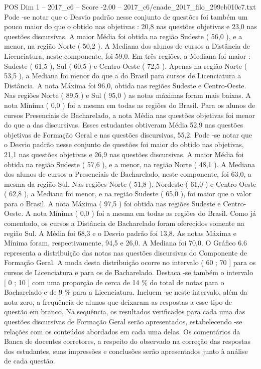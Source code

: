 \begin{textsample}{POS Dim 1 – 2017\_c6 – Score -2.00 – 2017\_c6/enade\_2017\_filo\_299cb010c7.txt}
Pode -se notar que o Desvio padrão nesse conjunto de questões foi também um pouco maior do que o obtido nas objetivas : 20,8 nas questões objetivas e 23,0 nas questões discursivas.
A maior Média foi obtida na região Sudeste ( 56,0 ), e a menor, na região Norte ( 50,2 ).
A Mediana dos alunos de cursos a Distância de Licenciatura, neste componente, foi 59,0.
Em três regiões, a Mediana foi maior : Sudeste ( 61,5 ), Sul ( 60,5 ) e Centro-Oeste ( 72,5 ).
Apenas na região Norte ( 53,5 ), a Mediana foi menor do que a do Brasil para cursos de Licenciatura a Distância.
A nota Máxima foi 96,0, obtida nas regiões Sudeste e Centro-Oeste.
Nas regiões Norte ( 89,5 ) e Sul ( 95,0 ) as notas máximas foram mais baixas.
A nota Mínima ( 0,0 ) foi a mesma em todas as regiões do Brasil.
Para os alunos de cursos Presenciais de Bacharelado, a nota Média nas questões objetivas foi menor do que a das discursivas.
Esses estudantes obtiveram Média 52,9 nas questões objetivas de Formação Geral e nas questões discursivas, 55,2.
Pode -se notar que o Desvio padrão nesse conjunto de questões foi maior do obtido nas objetivas, 21,1 nas questões objetivas e 26,9 nas questões discursivas.
A maior Média foi obtida na região Sudeste ( 57,6 ), e a menor, na região Norte ( 48,1 ).
A Mediana dos alunos de cursos a Presenciais de Bacharelado, neste componente, foi 63,0, a mesma da região Sul.
Nas regiões Norte ( 51,8 ), Nordeste ( 61,0 ) e Centro-Oeste ( 62,8 ), a Mediana foi menor, e na região Sudeste ( 65,0 ), foi maior que o valor para o Brasil.
A nota Máxima ( 97,5 ) foi obtida nas regiões Sudeste e Centro-Oeste.
A nota Mínima ( 0,0 ) foi a mesma em todas as regiões do Brasil.
Como já comentado, os cursos a Distância de Bacharelado foram oferecidos somente na região Sul.
A Média foi 68,3 e o Desvio padrão foi 13,8.
As notas Máxima e Mínima foram, respectivamente, 94,5 e 26,0.
A Mediana foi 70,0.
O Gráfico 6.6 representa a distribuição das notas nas questões discursivas do Componente de Formação Geral.
A moda desta distribuição ocorre no intervalo ( 60 ; 70 ] para os cursos de Licenciatura e para os de Bacharelado.
Destaca -se também o intervalo [ 0 ; 10 ] com uma proporção de cerca de 14 \% do total de notas para o Bacharelado e de 9 \% para a Licenciatura.
Incluem -se neste intervalo, além da nota zero, a frequência de alunos que deixaram as respostas a esse tipo de questão em branco.
Na sequência, os resultados verificados para cada uma das questões discursivas de Formação Geral serão apresentados, estabelecendo -se relações com os conteúdos abordados em cada uma delas.
Os comentários da Banca de docentes corretores, a respeito do observado na correção das respostas dos estudantes, suas impressões e conclusões serão apresentados junto à análise de cada questão.

\end{textsample}
